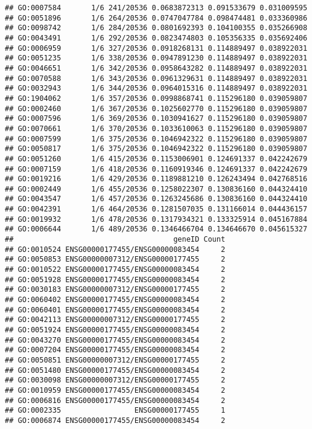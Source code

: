 \documentclass[
]{article}
\begin{document}
\begin{verbatim}
## GO:0007584       1/6 241/20536 0.0683872313 0.091533679 0.031009595
## GO:0051896       1/6 264/20536 0.0747047784 0.098474481 0.033360986
## GO:0098742       1/6 284/20536 0.0801692393 0.104100355 0.035266908
## GO:0043491       1/6 292/20536 0.0823474803 0.105356335 0.035692406
## GO:0006959       1/6 327/20536 0.0918268131 0.114889497 0.038922031
## GO:0051235       1/6 338/20536 0.0947891230 0.114889497 0.038922031
## GO:0046651       1/6 342/20536 0.0958643282 0.114889497 0.038922031
## GO:0070588       1/6 343/20536 0.0961329631 0.114889497 0.038922031
## GO:0032943       1/6 344/20536 0.0964015316 0.114889497 0.038922031
## GO:1904062       1/6 357/20536 0.0998868741 0.115296180 0.039059807
## GO:0002460       1/6 367/20536 0.1025602770 0.115296180 0.039059807
## GO:0007596       1/6 369/20536 0.1030941627 0.115296180 0.039059807
## GO:0070661       1/6 370/20536 0.1033610063 0.115296180 0.039059807
## GO:0007599       1/6 375/20536 0.1046942322 0.115296180 0.039059807
## GO:0050817       1/6 375/20536 0.1046942322 0.115296180 0.039059807
## GO:0051260       1/6 415/20536 0.1153006901 0.124691337 0.042242679
## GO:0007159       1/6 418/20536 0.1160919346 0.124691337 0.042242679
## GO:0019216       1/6 429/20536 0.1189881210 0.126243494 0.042768516
## GO:0002449       1/6 455/20536 0.1258022307 0.130836160 0.044324410
## GO:0043547       1/6 457/20536 0.1263245686 0.130836160 0.044324410
## GO:0042391       1/6 464/20536 0.1281507035 0.131166014 0.044436157
## GO:0019932       1/6 478/20536 0.1317934321 0.133325914 0.045167884
## GO:0006644       1/6 489/20536 0.1346466704 0.134646670 0.045615327
##                                     geneID Count
## GO:0010524 ENSG00000177455/ENSG00000083454     2
## GO:0050853 ENSG00000007312/ENSG00000177455     2
## GO:0010522 ENSG00000177455/ENSG00000083454     2
## GO:0051928 ENSG00000177455/ENSG00000083454     2
## GO:0030183 ENSG00000007312/ENSG00000177455     2
## GO:0060402 ENSG00000177455/ENSG00000083454     2
## GO:0060401 ENSG00000177455/ENSG00000083454     2
## GO:0042113 ENSG00000007312/ENSG00000177455     2
## GO:0051924 ENSG00000177455/ENSG00000083454     2
## GO:0043270 ENSG00000177455/ENSG00000083454     2
## GO:0007204 ENSG00000177455/ENSG00000083454     2
## GO:0050851 ENSG00000007312/ENSG00000177455     2
## GO:0051480 ENSG00000177455/ENSG00000083454     2
## GO:0030098 ENSG00000007312/ENSG00000177455     2
## GO:0010959 ENSG00000177455/ENSG00000083454     2
## GO:0006816 ENSG00000177455/ENSG00000083454     2
## GO:0002335                 ENSG00000177455     1
## GO:0006874 ENSG00000177455/ENSG00000083454     2

\end{verbatim}
\end{document}

